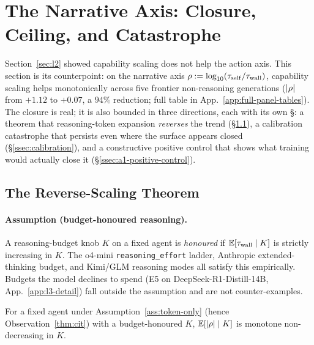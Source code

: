 
\section{The Narrative Axis: Closure, Ceiling, and Catastrophe}
\label{sec:l3}

Section~\ref{sec:l2} showed capability scaling does not help the action axis. This section is its counterpoint: on the narrative axis $\rho := \log_{10}(\tau_{\mathrm{self}}/\tau_{\mathrm{wall}})$, capability scaling helps monotonically across five frontier non-reasoning generations ($|\rho|$ from $+1.12$ to $+0.07$, a $94\%$ reduction; full table in App.~\ref{app:full-panel-tables}). The closure is real; it is also bounded in three directions, each with its own \S: a theorem that reasoning-token expansion \emph{reverses} the trend (\S\ref{ssec:reverse-scaling}), a calibration catastrophe that persists even where the surface appears closed (\S\ref{ssec:calibration}), and a constructive positive control that shows what training would actually close it (\S\ref{ssec:a1-positive-control}).

\subsection{The Reverse-Scaling Theorem}
\label{ssec:reverse-scaling}

\paragraph{Assumption (budget-honoured reasoning).}
\label{ass:budget-honoured}
A reasoning-budget knob $K$ on a fixed agent is \emph{honoured} if $\mathbb{E}[\tau_{\mathrm{wall}} \mid K]$ is strictly increasing in $K$. The o4-mini \texttt{reasoning\_effort} ladder, Anthropic extended-thinking budget, and Kimi/GLM reasoning modes all satisfy this empirically. Budgets the model declines to spend (E5 on DeepSeek-R1-Distill-14B, App.~\ref{app:l3-detail}) fall outside the assumption and are not counter-examples.

\begin{theorem}
\label{thm:reverse-scaling}
For a fixed agent under Assumption~\ref{ass:token-only} (hence Observation~\ref{thm:cit}) with a budget-honoured $K$, $\mathbb{E}[|\rho| \mid K]$ is monotone non-decreasing in $K$.
\end{theorem}

